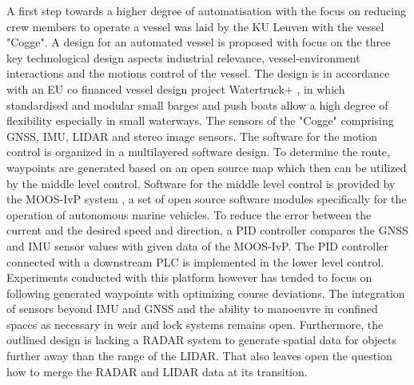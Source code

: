  A first step towards a higher degree of automatisation with the focus on reducing crew members to operate a vessel was laid by the KU Leuven with the vessel "Cogge". A design for an automated vessel is proposed with focus on the three key technological design aspects industrial relevance, vessel-environment interactions and the motions control of the vessel. The design is in accordance with an EU co financed vessel design project Watertruck+ \cite{watertruck}, in which standardised and modular small barges and push boats allow a high degree of flexibility especially in small waterways. The sensors of the "Cogge" comprising \ac{GNSS}, \ac{IMU}, \ac{LIDAR} and stereo image sensors. The software for the motion control is organized in a multilayered software design. To determine the route, waypoints are generated based on an open source map which then can be utilized by the middle level control. Software for the middle level control is provided by the \ac{MOOS-IvP} system \cite{MOOS}, a set of open source software modules specifically for the operation of autonomous marine vehicles. To reduce the error between the current and the desired speed and direction, a \ac{PID} controller compares the \ac{GNSS} and \ac{IMU} sensor values with given data of the \ac{MOOS-IvP}. The \ac{PID} controller connected with a downstream \ac{PLC} is implemented in the lower level control. Experiments conducted with this platform however has tended to focus on following generated waypoints with optimizing course deviations\cite{Peeters2020}. The integration of sensors beyond \ac{IMU} and \ac{GNSS} and the ability to manoeuvre in confined spaces as necessary in weir and lock systems remains open. Furthermore, the outlined design is lacking a \ac{RADAR} system to generate spatial data for objects further away than the range of the \ac{LIDAR}. That also leaves open the question how to merge the \ac{RADAR} and \ac{LIDAR} data at its transition.\\
 
